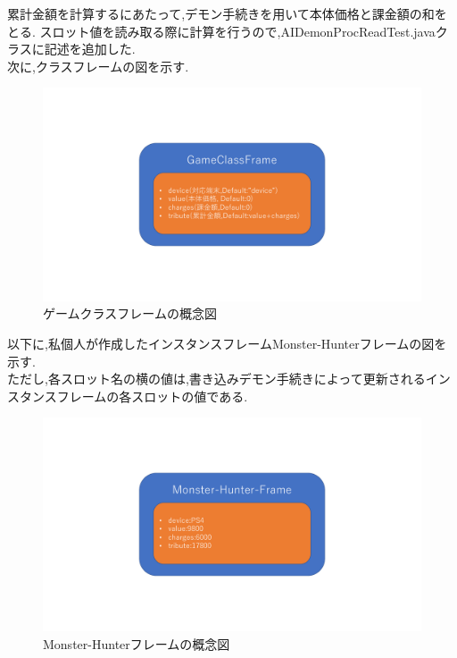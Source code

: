 \documentclass[uplatex,12pt]{jsarticle}
\begin{document}
累計金額を計算するにあたって,デモン手続きを用いて本体価格と課金額の和をとる.
スロット値を読み取る際に計算を行うので,AIDemonProcReadTest.javaクラスに記述を追加した. \\
次に,クラスフレームの図を示す.
\newpage
\begin{figure}[!hbt]
    \centering
    \includegraphics[scale=0.35]{images/game_class_frame.pdf}
    \caption{ゲームクラスフレームの概念図}
\end{figure}

以下に,私個人が作成したインスタンスフレームMonster-Hunterフレームの図を示す. \\
ただし,各スロット名の横の値は,書き込みデモン手続きによって更新されるインスタンスフレームの各スロットの値である.
\begin{figure}[!hbt]
    \centering
    \includegraphics[scale=0.35]{images/monster_hunter_frame.pdf}
    \caption{Monster-Hunterフレームの概念図}
\end{figure}
\end{document}
